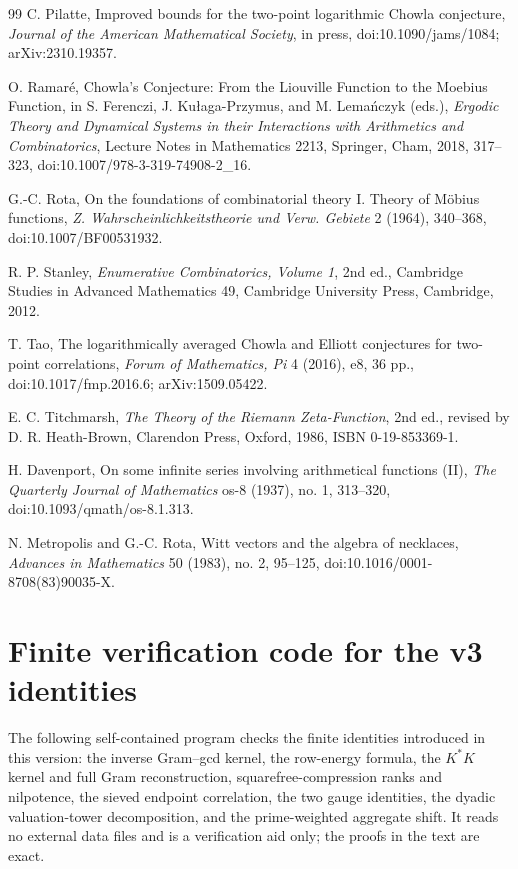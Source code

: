 \documentclass[11pt]{amsart}
\numberwithin{equation}{section}
\theoremstyle{plain}
\theoremstyle{definition}
\theoremstyle{remark}
\begin{document}
\begin{thebibliography}{99}
C. Pilatte,
Improved bounds for the two-point logarithmic Chowla conjecture,
\emph{Journal of the American Mathematical Society}, in press,
doi:10.1090/jams/1084; arXiv:2310.19357.

O. Ramaré,
Chowla's Conjecture: From the Liouville Function to the Moebius Function,
in S. Ferenczi, J. Kułaga-Przymus, and M. Lemańczyk (eds.),
\emph{Ergodic Theory and Dynamical Systems in their Interactions with Arithmetics and Combinatorics},
Lecture Notes in Mathematics 2213, Springer, Cham, 2018, 317--323,
doi:10.1007/978-3-319-74908-2\_16.

G.-C. Rota,
On the foundations of combinatorial theory I. Theory of Möbius functions,
\emph{Z. Wahrscheinlichkeitstheorie und Verw. Gebiete} 2 (1964), 340--368,
doi:10.1007/BF00531932.

R. P. Stanley,
\emph{Enumerative Combinatorics, Volume 1},
2nd ed., Cambridge Studies in Advanced Mathematics 49,
Cambridge University Press, Cambridge, 2012.

T. Tao,
The logarithmically averaged Chowla and Elliott conjectures for two-point correlations,
\emph{Forum of Mathematics, Pi} 4 (2016), e8, 36 pp.,
doi:10.1017/fmp.2016.6; arXiv:1509.05422.

E. C. Titchmarsh,
\emph{The Theory of the Riemann Zeta-Function},
2nd ed., revised by D. R. Heath-Brown,
Clarendon Press, Oxford, 1986, ISBN 0-19-853369-1.


H. Davenport,
On some infinite series involving arithmetical functions (II),
\emph{The Quarterly Journal of Mathematics} os-8 (1937), no. 1, 313--320,
doi:10.1093/qmath/os-8.1.313.

N. Metropolis and G.-C. Rota,
Witt vectors and the algebra of necklaces,
\emph{Advances in Mathematics} 50 (1983), no. 2, 95--125,
doi:10.1016/0001-8708(83)90035-X.

\end{thebibliography}

\appendix

\section{Finite verification code for the v3 identities}
\label{app:verification_code}

The following self-contained program checks the finite identities introduced in this version: the inverse Gram--gcd kernel, the row-energy formula, the $K^*K$ kernel and full Gram reconstruction, squarefree-compression ranks and nilpotence, the sieved endpoint correlation, the two gauge identities, the dyadic valuation-tower decomposition, and the prime-weighted aggregate shift.  It reads no external data files and is a verification aid only; the proofs in the text are exact.
\end{document}
